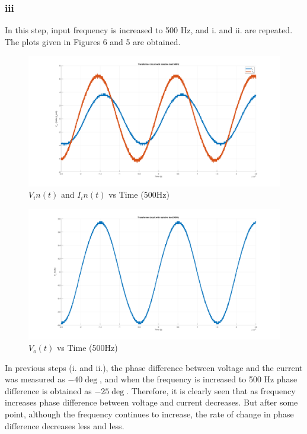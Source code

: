 \documentclass[letterpaper,12pt]{article}
\begin{document}
\subsubsection{iii}
In this step, input frequency is increased to 500 Hz, and i. and ii. are repeated. The plots given in Figures 6 and 5 are obtained.
\begin{figure}[H]
    \centering
    \includegraphics[width = 1\textwidth]{2_3_1.png}
    \caption{\(V_in(t) \) and \(I_in(t)\) vs Time (500Hz)}
\end{figure} 

\begin{figure}[H]
    \centering
    \includegraphics[width = 1\textwidth]{2_3_2.png}
    \caption{\(V_o(t) \) vs Time (500Hz)}
\end{figure} 

In previous steps (i. and ii.), the phase difference between voltage and the current was measured as \(-40\deg \), and when the frequency is increased to 500 Hz phase difference is obtained as \(-25\deg\). Therefore, it is clearly seen that as frequency increases phase difference between voltage and current decreases. But after some point, although the frequency continues to increase, the rate of change in phase difference decreases less and less. 
%
\end{document}

